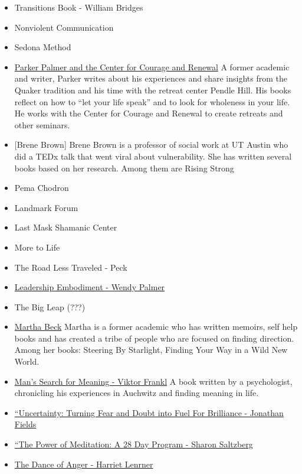 \documentclass[]{book}
\providecommand{\tightlist}{%
  \setlength{\itemsep}{0pt}\setlength{\parskip}{0pt}}
\theoremstyle{definition}
\theoremstyle{definition}
\theoremstyle{definition}
\theoremstyle{remark}
\begin{document}
\begin{itemize}
\tightlist
\item
  Transitions Book - William Bridges
\item
  Nonviolent Communication
\item
  Sedona Method
\item
  \href{http://www.couragerenewal.org/}{Parker Palmer and the Center for
  Courage and Renewal} A former academic and writer, Parker writes about
  his experiences and share insights from the Quaker tradition and his
  time with the retreat center Pendle Hill. His books reflect on how to
  ``let your life speak'' and to look for wholeness in your life. He
  works with the Center for Courage and Renewal to create retreats and
  other seminars.\\
\item
  {[}Brene Brown{]} Brene Brown is a professor of social work at UT
  Austin who did a TEDx talk that went viral about vulnerability. She
  has written several books based on her research. Among them are Rising
  Strong
\item
  Pema Chodron
\item
  Landmark Forum
\item
  Last Mask Shamanic Center
\item
  More to Life
\item
  The Road Less Traveled - Peck
\item
  \href{http://www.leadershipembodiment.com/}{Leadership Embodiment -
  Wendy Palmer}
\item
  The Big Leap (???)
\item
  \href{https://marthabeck.com/}{Martha Beck} Martha is a former
  academic who has written memoirs, self help books and has created a
  tribe of people who are focused on finding direction. Among her books:
  Steering By Starlight, Finding Your Way in a Wild New World.
\item
  \href{https://en.wikipedia.org/wiki/Man\%27s_Search_for_Meaning}{Man's
  Search for Meaning - Viktor Frankl} A book written by a psychologist,
  chronicling his experiences in Auchwitz and finding meaning in life.
\item
  \href{http://www.jonathanfields.com/}{``Uncertainty: Turning Fear and
  Doubt into Fuel For Brilliance - Jonathan Fields}
\item
  \href{https://www.sharonsalzberg.com/}{``The Power of Meditation: A 28
  Day Program - Sharon Saltzberg}
\item
  \href{https://www.harrietlerner.com/}{The Dance of Anger - Harriet
  Lenrner}
\end{itemize}
\end{document}

